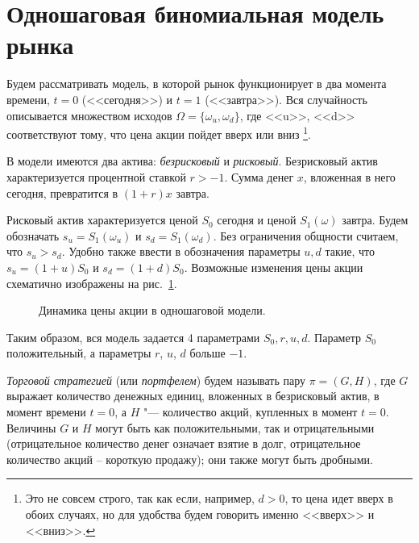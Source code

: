 \section{Одношаговая биномиальная модель рынка}

Будем рассматривать модель, в которой рынок функционирует в два момента времени, $t=0$ (<<сегодня>>) и $t=1$ (<<завтра>>).
Вся случайность описывается множеством исходов $\Omega=\{\omega_u, \omega_d\}$, где <<u>>, <<d>> соответствуют тому, что цена акции пойдет вверх или вниз%
\footnote{Это не совсем строго, так как если, например, $d>0$, то цена идет вверх в обоих случаях, но для удобства будем говорить именно <<вверх>> и <<вниз>>.}. 

В модели имеются два актива: \emph{безрисковый} и \emph{рисковый}.
Безрисковый актив характеризуется процентной ставкой $r>-1$.
Сумма денег $x$, вложенная в него сегодня, превратится в $(1+r)x$ завтра.

Рисковый актив характеризуется ценой $S_0$ сегодня и ценой
$S_1(\omega)$ завтра.
Будем обозначать $s_u = S_1(\omega_u)$ и $s_d= S_1(\omega_d)$.
Без ограничения общности считаем, что $s_u>s_d$. 
Удобно также ввести в обозначения параметры $u,d$ такие, что $s_u = (1+u)S_0$ и $s_d = (1+d) S_0$. 
Возможные изменения цены акции схематично изображены на рис.~\ref{os:f:price}.

\begin{figure}[h]
\centering
\caption{Динамика цены акции в одношаговой модели.}
\label{os:f:price}  
\end{figure}

Таким образом, вся модель задается 4 параметрами $S_0,r,u,d$. Параметр $S_0$ положительный, а параметры $r$, $u$, $d$ больше $-1$.

\emph{Торговой стратегией} (или \emph{портфелем}) будем называть пару $\pi=(G,H)$, где $G$ выражает количество денежных единиц, вложенных в безрисковый актив, в момент времени $t=0$, а $H$ "--- количество акций, купленных в момент $t=0$.
Величины $G$ и $H$ могут быть как положительными, так и отрицательными (отрицательное количество денег означает взятие в долг, отрицательное количество акций -- короткую продажу); они также могут быть дробными. 


